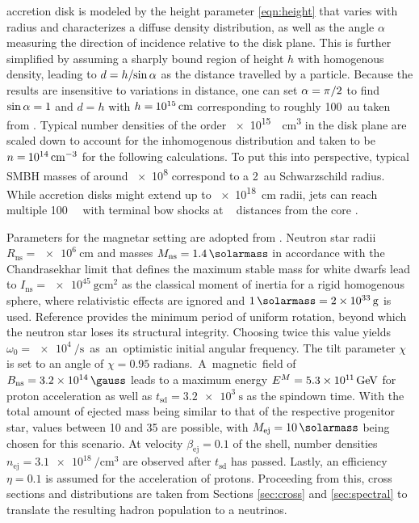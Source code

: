 accretion disk is modeled by the height parameter \eqref{eqn:height} that varies with radius and characterizes a diffuse density
distribution, as well as the angle $\alpha$ measuring the direction of incidence relative to the disk plane. This is further
simplified by assuming a sharply bound region of height $h$ with homogenous density, leading to $d = h / \kern-2.0pt \sin \alpha$
as the distance travelled by a particle. Because the results are insensitive to variations in distance, one can set
$\alpha = \pi \kern+0.25pt / 2$ to find $\sin\alpha = \kern-0.1pt 1$ and $d = h$ with $h = \kern-0.5pt \smash{\qty{e15}{\centi\meter}}$
corresponding to roughly \qty{100}{\astronomicalunit} taken from \cite{King_2008}. Typical number densities of the order
\qty{e15}{\per\centi\meter\cubed} in the disk plane \cite{Garcia_2013, Garcia_2014} are scaled down to account for the
inhomogenous distribution and taken to be $n = \kern-0.5pt \smash{\qty{e14}{\per\centi\meter\cubed}}$ for the following calculations.
To put this into perspective, typical SMBH masses of around \qty{e8}{\solarmass} correspond to a \qty{2}{\astronomicalunit} Schwarzschild
radius. While accretion disks might extend up to \qty{e18}{\centi\meter} radii, jets can reach multiple \qty{100}{\kilo\parsec}
with terminal bow shocks at \unit{\mega\parsec} distances from the core \cite{Blandford_2019, King_2008, Murase_2023}.

\newpage

Parameters for the magnetar setting are adopted from \cite{Carpio_2020}. Neutron star radii $R_\text{ns} = \qty{e6}{\centi\meter}$
and masses $M_\text{ns} = \qty{1.4}{\solarmass}$ in accordance with the Chandrasekhar limit that defines the maximum stable mass for
white dwarfs lead to $I_\text{ns} = \qty{e45}{\gram\centi\meter\squared}$ as the classical moment of inertia for a rigid homogenous
sphere, where relativistic effects are ignored and $\qty{1}{\solarmass} = \qty{2e33}{\gram}$ is used. Reference \cite{Haensel_1999}
provides the minimum period of uniform rotation, beyond which the neutron star loses its structural integrity. Choosing twice this
value yields $\omega_0 = \qty{e4}{\per\second}$~as~an~optimistic initial angular frequency. The tilt parameter $\chi$ is set to an
angle of $\chi = \num{0.95}$ radians.~A~magnetic~field of~$B_\text{ns} = \qty{3.2e14}{\gauss}$ leads to a maximum energy
$E^M = \num{5.3} \times 10^{1 \kern-0.3pt 1} \kern+1.5pt \unit{\giga\electronvolt}$ for proton acceleration as well as
$t_\text{sd} = \qty{3.2e3}{\second}$ as the spindown time. With the total amount of ejected mass being similar to that of the
respective progenitor star, values between \qty{10}{\solarmass} and \qty{35}{\solarmass} are possible, with
$M_\text{ej} = \qty{10}{\solarmass}$ being chosen for this scenario. At velocity $\beta_\text{ej} = \num{0.1}$
of the shell, number densities $n_\text{ej} = \qty{3.1e18}{\per\centi\meter\cubed}$ are  observed after $t_\text{sd}$
has passed. Lastly, an efficiency $\eta = \num{0.1}$ is assumed for the acceleration of protons. Proceeding from this, cross
sections and distributions are taken from Sections \ref{sec:cross} and \ref{sec:spectral} to translate the resulting hadron
population to a neutrinos.



